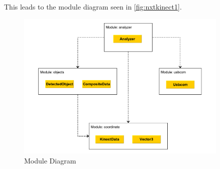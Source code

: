 This leads to the module diagram seen in \autoref{fig:nxtkinect1}.

\begin{figure}[hbtp]
\includegraphics[width=0.90\textwidth]{img/nxtkinect1.pdf}
\caption{Module Diagram} 
\label{fig:nxtkinect1} 
\end{figure}

